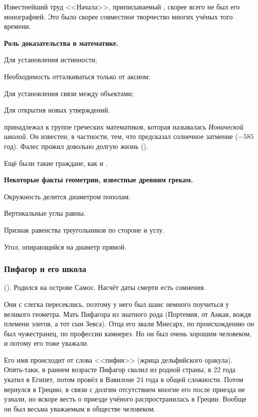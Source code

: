 \documentclass[a4paper,oneside,fleqn,10pt]{article}
\begin{document}
Известнейший труд <<Начала>>, приписываемый , скорее всего не
был его монографией. Это было скорее совместное творчество многих учёных
того времени.

\textbf{Роль доказательства в математике.}

\begin{items}{-2}
\item Для установления истинности;
\item Необходимость отталкиваться только от аксиом;
\item Для установления связи между объектами;
\item Для открытия новых утверждений.
\end{items}

 принадлежал к группе греческих математиков, которая называлась \emph{Ионической школой}.
Он известен, в частности, тем, что предсказал солнечное затмение ($-585$ год). Фалес прожил довольно долгую
жизнь ().

Ещё были такие граждане, как  и .

\textbf{Некоторые факты геометрии, известные древним грекам.}

\begin{items}{-2}
\item Окружность делится диаметром пополам.
\item Вертикальные углы равны.
\item Признак равенства треугольников по стороне и углу.
\item Угол, опирающийся на диаметр прямой.
\end{items}

\subsubsection{Пифагор и его школа}

 (). Родился на острове Самос.
Насчёт даты смерти есть сомнения.

Они с  слегка пересеклись, поэтому у него был шанс немного поучиться у великого геометра.
Мать Пифагора из знатного рода (Портемия, от Анкая, вождя племени элегов, а тот сын Зевса).
Отца его звали Мнесарх, по происхождению он был чужестранец, по профессии камнерез.
Но он был очень хорошим человеком, и потому его тоже уважали.

Его имя происходит от слова <<пифия>> (жрица дельфийского оракула). Опять-таки, в раннем возрасте
Пифагор свалил из родной страны, в 22 года укатил в Египет, потом провёл в Вавилоне 24 года в
общей сложности. Потом вернулся в Грецию, в связи с долгим отсутствием
многие его после приезда не узнали, но вскоре весть о приезде учёного распространилась
в Греции. Вообще он был весьма уважаемым в обществе человеком.
\end{document}
